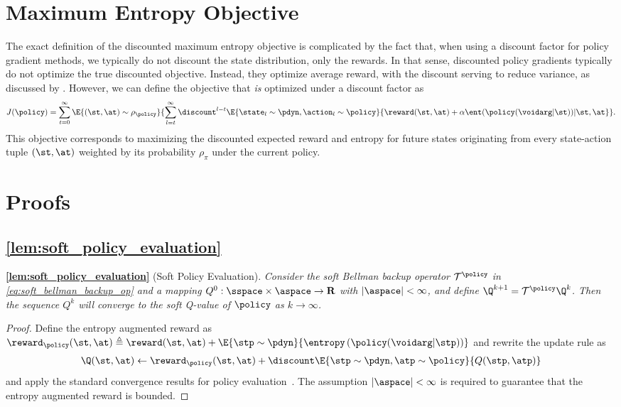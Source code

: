 \documentclass{article}
\begin{document}
\section{Maximum Entropy Objective}
%
\label{app:objective}
The exact definition of the discounted maximum entropy objective is complicated by the fact that, when using a discount factor for policy gradient methods, we typically do not discount the state distribution, only the rewards. In that sense, discounted policy gradients typically do not optimize the true discounted objective. Instead, they optimize average reward, with the discount serving to reduce variance, as discussed by \citet{thomas2014bias}. However, we can define the objective that \emph{is} optimized under a discount factor as
\begin{align}
J(\policy) = \sum_{t=0}^\infty \E{(\st,\at) \sim \rho_\policy}{ \sum_{l=t}^\infty \discount^{l-t} \E{\state_l\sim\pdyn,\action_l\sim\policy}{ \reward(\st,\at) + \alpha \ent(\policy(\voidarg|\st))|\st,\at}}.
\end{align}
This objective corresponds to maximizing the discounted expected reward and entropy for future states originating from every state-action tuple $(\st,\at)$ weighted by its probability $\rho_\pi$ under the current policy.
%

\section{Proofs}
%

\subsection{\autoref{lem:soft_policy_evaluation}}
\label{app:lem_soft_policy_evaluation}



\textbf{\autoref{lem:soft_policy_evaluation}} (Soft Policy Evaluation).\textit{
Consider the soft Bellman backup operator $\mathcal{T}^\policy$ in \autoref{eq:soft_bellman_backup_op} and a mapping $Q^0: \sspace \times \aspace\rightarrow \reals$ with $|\aspace|<\infty$, and define $\Q^{k+1} = \mathcal{T}^\policy \Q^k$. Then the sequence $Q^k$ will converge to the soft Q-value of $\policy$ as $k\rightarrow \infty$.}
\begin{proof}
Define the entropy augmented reward as $\reward_\policy(\st, \at) \triangleq \reward(\st, \at)  + \E{\stp\sim\pdyn}{\entropy\left(\policy(\voidarg|\stp)\right)}$ and rewrite the update rule as 
\begin{align}
\Q(\st, \at) \leftarrow \reward_\policy(\st, \at) + \discount \E{\stp\sim\pdyn,\atp \sim \policy}{Q(\stp, \atp)}
\end{align}
and apply the standard convergence results for policy evaluation~\citep{sutton1998reinforcement}. The assumption $|\aspace|<\infty$ is required to guarantee that the entropy augmented reward is bounded.
\end{proof}
\end{document}
